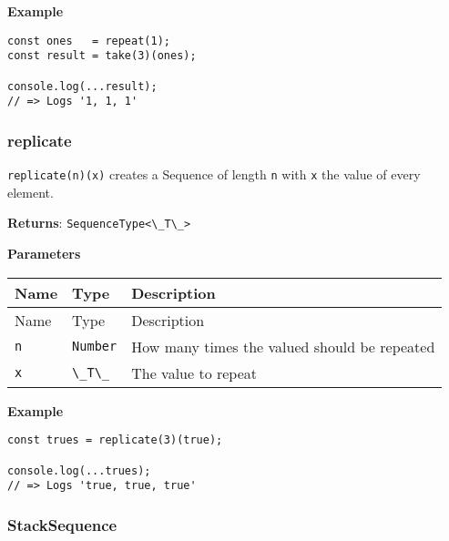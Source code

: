 \textbf{Example}

\begin{lstlisting}[label=bd4ef248-0e38-4975-9d86-0bd39d562690]
const ones   = repeat(1);
const result = take(3)(ones);
                             
console.log(...result);
// => Logs '1, 1, 1'
\end{lstlisting}

\hypertarget{deb72945-4996-448f-a8dc-5256934ab44c}{%
\subsubsection{replicate}\label{deb72945-4996-448f-a8dc-5256934ab44c}}

\passthrough{\lstinline!replicate(n)(x)!} creates a Sequence of length
\passthrough{\lstinline!n!} with \passthrough{\lstinline!x!} the value
of every element.

\textbf{Returns}: \passthrough{\lstinline!SequenceType<\_T\_>!}

\textbf{Parameters}

\begin{longtable}[]{
  >{\raggedright\arraybackslash}p{}
  >{\raggedright\arraybackslash}p{}
  >{\raggedright\arraybackslash}p{}@{}}

\toprule\noalign{}
Name & Type & Description \\
\midrule\noalign{}
\endfirsthead
\toprule\noalign{}
Name & Type & Description \\
\midrule\noalign{}
\endhead
\bottomrule\noalign{}
\endlastfoot
\passthrough{\lstinline!n!} & \passthrough{\lstinline!Number!} & How
many times the valued should be repeated \\
\passthrough{\lstinline!x!} & \passthrough{\lstinline!\_T\_!} & The
value to repeat \\
\end{longtable}

\textbf{Example}

\begin{lstlisting}[label=ccbcf172-af5e-478c-8044-fbe706545e55]
const trues = replicate(3)(true);
                                 
console.log(...trues);
// => Logs 'true, true, true'
\end{lstlisting}

\hypertarget{46837924-fa5a-4411-ba84-7dea9a3152bc}{%
\subsubsection{StackSequence}\label{46837924-fa5a-4411-ba84-7dea9a3152bc}}

